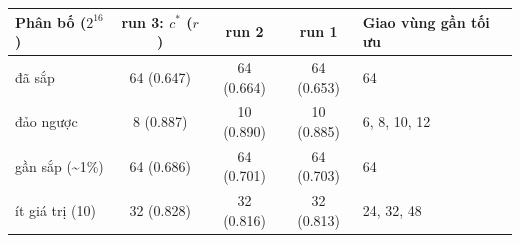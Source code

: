 \begin{tabular}{lcccl}
\toprule
Phân bố ($2^{16}$) & run 3: $c^*$ ($r$) & run 2 & run 1 & Giao vùng gần tối ưu \\
\midrule
đã sắp & 64 (0.647) & 64 (0.664) & 64 (0.653) & 64 \\
đảo ngược & 8 (0.887) & 10 (0.890) & 10 (0.885) & 6, 8, 10, 12 \\
gần sắp (\textasciitilde 1\%) & 64 (0.686) & 64 (0.701) & 64 (0.703) & 64 \\
ít giá trị (10) & 32 (0.828) & 32 (0.816) & 32 (0.813) & 24, 32, 48 \\
\bottomrule
\end{tabular}
